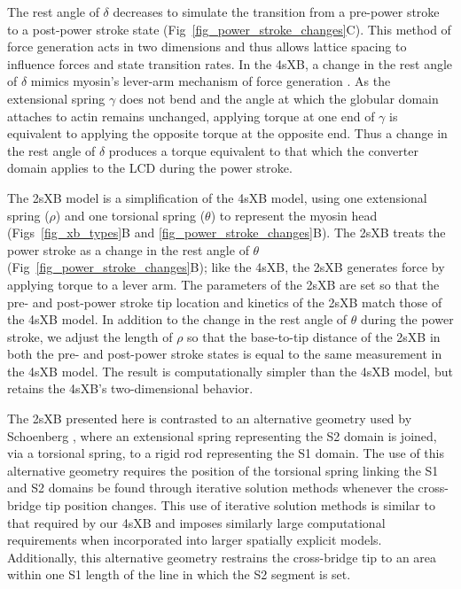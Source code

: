 \documentclass[10pt]{article}
\newcommand{\citep}[1]{\cite{#1}} %
\begin{document}
The rest angle of $\delta$ decreases to simulate the transition from a pre-power stroke to a post-power stroke state (Fig~\ref{fig_power_stroke_changes}C).
This method of force generation acts in two dimensions and thus allows lattice spacing to influence forces and state transition rates. 
In the 4sXB, a change in the rest angle of $\delta$ mimics myosin's lever-arm mechanism of force generation \citep{Houdusse2000, Houdusse2001}. 
As the extensional spring $\gamma$ does not bend and the angle at which the globular domain attaches to actin remains unchanged, applying torque at one end of $\gamma$ is equivalent to applying the opposite torque at the opposite end.
Thus a change in the rest angle of $\delta$ produces a torque equivalent to that which the converter domain applies to the LCD during the power stroke.

The 2sXB model is a simplification of the 4sXB model, using one extensional spring ($\rho$) and one torsional spring ($\theta$) to represent the myosin head (Figs~\ref{fig_xb_types}B and \ref{fig_power_stroke_changes}B).
The 2sXB treats the power stroke as a change in the rest angle of $\theta$ (Fig~\ref{fig_power_stroke_changes}B); like the 4sXB, the 2sXB generates force by applying torque to a lever arm.
The parameters of the 2sXB are set so that the pre- and post-power stroke tip location and kinetics of the 2sXB match those of the 4sXB model. 
In addition to the change in the rest angle of $\theta$ during the power stroke, we adjust the length of $\rho$ so that the base-to-tip distance of the 2sXB in both the pre- and post-power stroke states is equal to the same measurement in the 4sXB model.
The result is computationally simpler than the 4sXB model, but retains the 4sXB's two-dimensional behavior.

The 2sXB presented here is contrasted to an alternative geometry used by Schoenberg \citep{Schoenberg1980a, Schoenberg1980b}, where an extensional spring representing the S2 domain is joined, via a torsional spring, to a rigid rod representing the S1 domain.
The use of this alternative geometry requires the position of the torsional spring linking the S1 and S2 domains be found through iterative solution methods whenever the cross-bridge tip position changes. 
This use of iterative solution methods is similar to that required by our 4sXB and imposes similarly large computational requirements when incorporated into larger spatially explicit models. 
Additionally, this alternative geometry restrains the cross-bridge tip to an area within one S1 length of the line in which the S2 segment is set.
\end{document}
